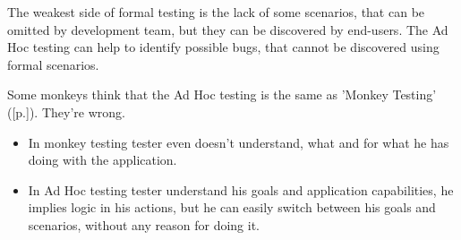 The weakest side of formal testing is the lack of some scenarios, that can be omitted by development team, but they can be discovered by end-users. The Ad Hoc testing can help to identify possible bugs, that cannot be discovered using formal scenarios.

Some monkeys think that the Ad Hoc testing is the same as 'Monkey Testing' ([p.\pageref{sec:Monkey Testing}]). They're wrong.

\begin{itemize}
\item {In monkey testing tester even doesn't understand, what and for what he has doing with the application.}

\item {In Ad Hoc testing tester understand his goals and application capabilities, he implies logic in his actions, but he can easily switch between his goals and scenarios, without any reason for doing it.}
\end{itemize}
